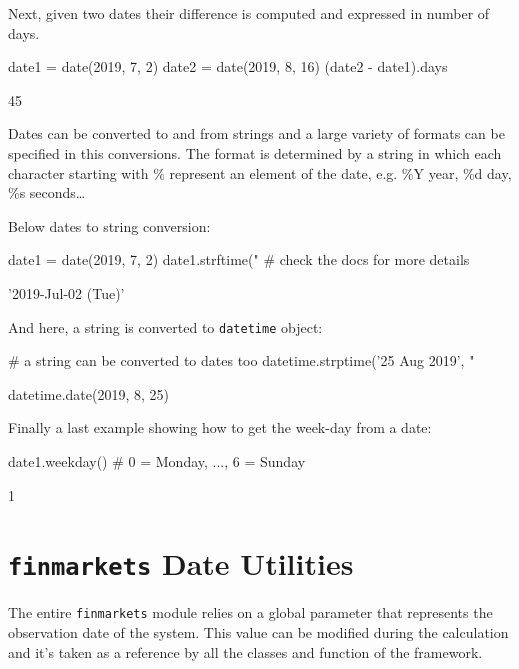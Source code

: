 Next, given two dates their difference is computed and expressed in number of days.

\begin{ipythonnon}
date1 = date(2019, 7, 2)
date2 = date(2019, 8, 16)
(date2 - date1).days
\end{ipythonnon}
\begin{ioutput}
45
\end{ioutput}

Dates can be converted to and from strings and a large variety of formats can be specified in this conversions.
The format is determined by a string in which each character starting with \% represent an element
of the date, e.g. \%Y year, \%d day, \%s seconds\ldots

Below dates to string conversion:

\begin{ipythonnon}
date1 = date(2019, 7, 2)
date1.strftime("%
                                # check the docs for more details
\end{ipythonnon}
\begin{ioutput}
'2019-Jul-02 (Tue)'
\end{ioutput}

And here, a string is converted to \texttt{datetime} object:

\begin{ipythonnon}
# a string can be converted to dates too
datetime.strptime('25 Aug 2019', "%
\end{ipythonnon}
\begin{ioutput}
datetime.date(2019, 8, 25)
\end{ioutput}

Finally a last example showing how to get the week-day from a date:

\begin{ipythonnon}
date1.weekday() # 0 = Monday, ..., 6 = Sunday
\end{ipythonnon}
\begin{ioutput}
1
\end{ioutput}

\section{\texttt{finmarkets} Date Utilities}

\begin{finmarkets}
The entire \texttt{finmarkets} module relies on a global parameter that represents the observation date of the system.
This value can be modified during the calculation and it's taken as a reference by all the classes and function of the framework.
\end{finmarkets}

